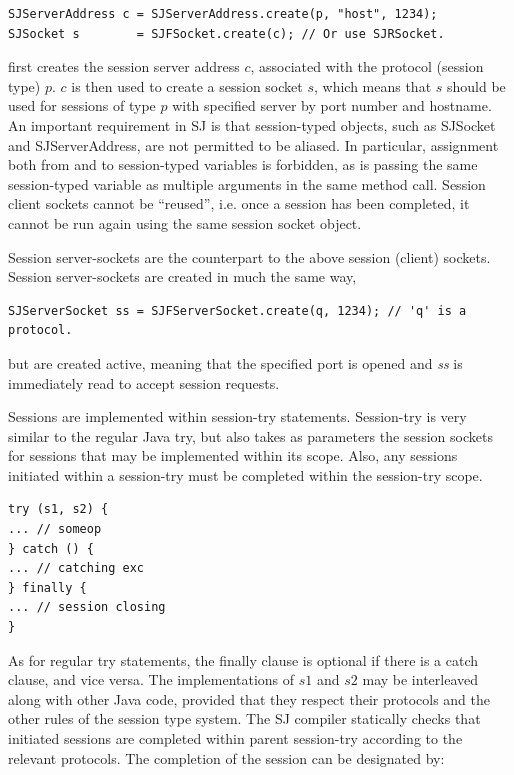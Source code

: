 \begin{lstlisting}
SJServerAddress c = SJServerAddress.create(p, "host", 1234);
SJSocket s        = SJFSocket.create(c); // Or use SJRSocket.
\end{lstlisting}
first creates the session server address $c$, associated with the protocol (session type) $p$. $c$ is then used to create a session socket $s$, which means that $s$ should be used for sessions of type $p$ with specified server by port number and hostname. An important requirement in SJ is that session-typed objects, such as SJSocket and SJServerAddress, are not permitted to be aliased. In particular, assignment both from and to session-typed variables is forbidden, as is passing the same session-typed variable as multiple arguments in the same method call. Session client sockets cannot be ``reused'', i.e. once a session has been completed, it cannot be run again using the same session socket object.

Session server-sockets are the counterpart to the above session (client) sockets. Session server-sockets are created in much the same way,

\begin{lstlisting}
SJServerSocket ss = SJFServerSocket.create(q, 1234); // 'q' is a protocol.
\end{lstlisting}
but are created active, meaning that the specified port is opened and \textit{ss} is immediately read to accept session requests.

Sessions are implemented within session-try statements. Session-try is very similar to the regular Java try, but also takes as parameters the session sockets for sessions that may be implemented within its scope. Also, any sessions initiated within a session-try must be completed within the session-try scope.

\begin{lstlisting}
try (s1, s2) { 
... // someop
} catch () {
... // catching exc
} finally {
... // session closing
}
\end{lstlisting}

As for regular try statements, the finally clause is optional if there is a catch clause, and vice versa. The implementations of $s1$ and $s2$ may be interleaved along with other Java code, provided that they respect their protocols and the other rules of the session type system. The SJ compiler statically checks that initiated sessions are completed within parent session-try according to the relevant protocols. The completion of the session can be designated by:


